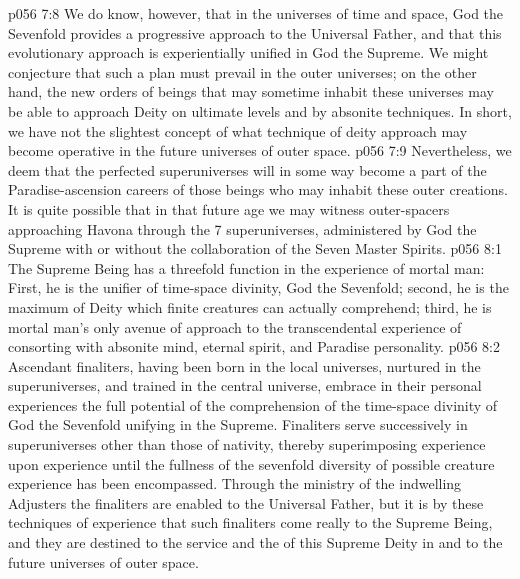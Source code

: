 \vs p056 7:8 We do know, however, that in the universes of time and space, God the Sevenfold provides a progressive approach to the Universal Father, and that this evolutionary approach is experientially unified in God the Supreme. We might conjecture that such a plan must prevail in the outer universes; on the other hand, the new orders of beings that may sometime inhabit these universes may be able to approach Deity on ultimate levels and by absonite techniques. In short, we have not the slightest concept of what technique of deity approach may become operative in the future universes of outer space.
\vs p056 7:9 Nevertheless, we deem that the perfected superuniverses will in some way become a part of the Paradise\hyp{}ascension careers of those beings who may inhabit these outer creations. It is quite possible that in that future age we may witness outer\hyp{}spacers approaching Havona through the 7 superuniverses, administered by God the Supreme with or without the collaboration of the Seven Master Spirits.
\vs p056 8:1 The Supreme Being has a threefold function in the experience of mortal man: First, he is the unifier of time\hyp{}space divinity, God the Sevenfold; second, he is the maximum of Deity which finite creatures can actually comprehend; third, he is mortal man’s only avenue of approach to the transcendental experience of consorting with absonite mind, eternal spirit, and Paradise personality.
\vs p056 8:2 Ascendant finaliters, having been born in the local universes, nurtured in the superuniverses, and trained in the central universe, embrace in their personal experiences the full potential of the comprehension of the time\hyp{}space divinity of God the Sevenfold unifying in the Supreme. Finaliters serve successively in superuniverses other than those of nativity, thereby superimposing experience upon experience until the fullness of the sevenfold diversity of possible creature experience has been encompassed. Through the ministry of the indwelling Adjusters the finaliters are enabled to  the Universal Father, but it is by these techniques of experience that such finaliters come really to  the Supreme Being, and they are destined to the service and the  of this Supreme Deity in and to the future universes of outer space.
